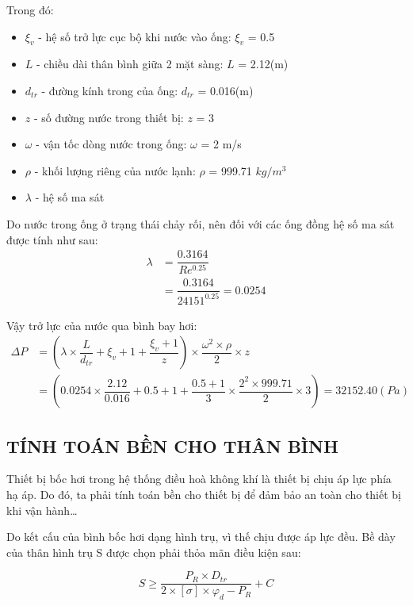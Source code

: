 Trong đó:
\begin{itemize}
	\item $\xi_{v}$ - hệ số trở lực cục bộ khi nước vào ống: $\xi_{v}$ = 0.5
	\item $L$ - chiều dài thân bình giữa 2 mặt sàng: $L$ = 2.12(m)
	\item $d_{tr}$ - đường kính trong của ống: $d_{tr}$ = 0.016(m)
	\item $z$ - số đường nước trong thiết bị: $z$ = 3
	\item $\omega$ - vận tốc dòng nước trong ống: $\omega$ = 2 m/s
	\item $\rho$ - khối lượng riêng của nước lạnh: $\rho$ = 999.71 $kg/m^3$
	\item $\lambda$ - hệ số ma sát	
\end{itemize}

Do nước trong ống ở trạng thái chảy rối, nên đối với các ống đồng hệ số ma sát được tính như sau:
\begin{equation*}
	\begin{split}
		\lambda &= \dfrac{0.3164}{Re^{0.25}}\\
		&=  \dfrac{0.3164}{24151^{0.25}}=0.0254
	\end{split}
\end{equation*}

Vậy trở lực của nước qua bình bay hơi:
\begin{equation*}
	\begin{split}
		\Delta P &= \left(\lambda\times\dfrac{L}{d_{tr}} +\xi_{v} + 1 + \dfrac{\xi_{v} + 1}{z}\right)\times \dfrac{\omega^2\times\rho}{2}\times z\\
		&=  (0.0254 \times \dfrac{2.12}{0.016}+0.5+1+ \dfrac{0.5+1}{3} \times \dfrac{2^2 \times 999.71}{2} \times 3) = 32152.40(Pa)
	\end{split}
\end{equation*}

\subsection{TÍNH TOÁN BỀN CHO THÂN BÌNH}
Thiết bị bốc hơi trong hệ thống điều hoà không khí là thiết bị chịu áp lực phía hạ áp. Do đó, ta phải tính toán bền cho thiết bị để đảm bảo an toàn cho thiết bị khi vận hành…

Do kết cấu của bình bốc hơi dạng hình trụ, vì thế chịu được áp lực đều. Bề dày của thân hình trụ S được chọn phải thỏa mãn điều kiện sau:

\begin{equation*}
	S \geq \dfrac{P_{R}\times D_{tr}}{2\times [\sigma]\times\varphi_{d} - P_{R}} + C
\end{equation*}

